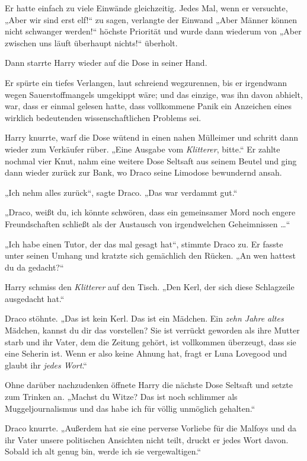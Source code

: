 {Er hatte einfach zu viele Einwände gleichzeitig. Jedes Mal, wenn er versuchte, „Aber wir sind erst elf!“ zu sagen, verlangte der Einwand „Aber Männer können nicht schwanger werden!“ höchste Priorität und wurde dann wiederum von „Aber zwischen uns läuft überhaupt nichts!“ überholt.

Dann starrte Harry wieder auf die Dose in seiner Hand.

Er spürte ein tiefes Verlangen, laut schreiend wegzurennen, bis er irgendwann wegen Sauerstoffmangels umgekippt wäre; und das einzige, was ihn davon abhielt, war, dass er einmal gelesen hatte, dass vollkommene Panik ein Anzeichen eines wirklich bedeutenden wissenschaftlichen Problems sei.

Harry knurrte, warf die Dose wütend in einen nahen Mülleimer und schritt dann wieder zum Verkäufer rüber. „Eine Ausgabe vom \emph{Klitterer}, bitte.“ Er zahlte nochmal vier Knut, nahm eine weitere Dose Seltsaft aus seinem Beutel und ging dann wieder zurück zur Bank, wo Draco seine Limodose bewundernd ansah.

„Ich nehm alles zurück“, sagte Draco. „Das war verdammt gut.“

„Draco, weißt du, ich könnte schwören, dass ein gemeinsamer Mord noch engere Freundschaften schließt als der Austausch von irgendwelchen Geheimnissen …“

„Ich habe einen Tutor, der das mal gesagt hat“, stimmte Draco zu. Er fasste unter seinen Umhang und kratzte sich gemächlich den Rücken. „An wen hattest du da gedacht?“

Harry schmiss den \emph{Klitterer} auf den Tisch. „Den Kerl, der sich diese Schlagzeile ausgedacht hat.“

Draco stöhnte. „Das ist kein Kerl. Das ist ein Mädchen. Ein \emph{zehn Jahre altes} Mädchen, kannst du dir das vorstellen? Sie ist verrückt geworden als ihre Mutter starb und ihr Vater, dem die Zeitung gehört, ist vollkommen überzeugt, dass sie eine Seherin ist. Wenn er also keine Ahnung hat, fragt er Luna Lovegood und glaubt ihr \emph{jedes Wort}.“

Ohne darüber nachzudenken öffnete Harry die nächste Dose Seltsaft und setzte zum Trinken an. „Machst du Witze? Das ist noch schlimmer als Muggeljournalismus und das habe ich für völlig unmöglich gehalten.“

Draco knurrte. „Außerdem hat sie eine perverse Vorliebe für die Malfoys und da ihr Vater unsere politischen Ansichten nicht teilt, druckt er jedes Wort davon. Sobald ich alt genug bin, werde ich sie vergewaltigen.“

}
